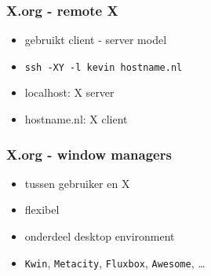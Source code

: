 \documentclass{beamer}
\begin{document}
\begin{frame}
  \frametitle{X.org - remote X}
  \begin{itemize}
  \item<1-> gebruikt client - server model
  \item<2-> \texttt{ssh -XY -l kevin hostname.nl}
  \item<3-> localhost: X server
  \item<3-> hostname.nl: X client
  \end{itemize}
\end{frame}

\begin{frame}
  \frametitle{X.org - window managers}
  \begin{itemize}
  \item<1-> tussen gebruiker en X
  \item<2-> flexibel
  \item<3-> onderdeel desktop environment
  \item<4-> \texttt{Kwin}, \texttt{Metacity}, \texttt{Fluxbox}, \texttt{Awesome}, \ldots
  \end{itemize}
\end{frame}
\end{document}
